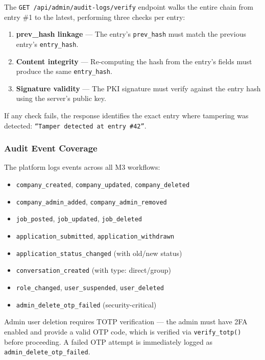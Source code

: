 The \texttt{GET /api/admin/audit-logs/verify} endpoint walks the entire chain from entry \#1 to the latest, performing three checks per entry:

\begin{enumerate}
    \item \textbf{prev\_hash linkage} — The entry's \texttt{prev\_hash} must match the previous entry's \texttt{entry\_hash}.
    \item \textbf{Content integrity} — Re-computing the hash from the entry's fields must produce the same \texttt{entry\_hash}.
    \item \textbf{Signature validity} — The PKI signature must verify against the entry hash using the server's public key.
\end{enumerate}

If any check fails, the response identifies the exact entry where tampering was detected: \texttt{``Tamper detected at entry \#42''}.

\subsubsection{Audit Event Coverage}

The platform logs events across all M3 workflows:
\begin{itemize}[noitemsep]
    \item \texttt{company\_created}, \texttt{company\_updated}, \texttt{company\_deleted}
    \item \texttt{company\_admin\_added}, \texttt{company\_admin\_removed}
    \item \texttt{job\_posted}, \texttt{job\_updated}, \texttt{job\_deleted}
    \item \texttt{application\_submitted}, \texttt{application\_withdrawn}
    \item \texttt{application\_status\_changed} (with old/new status)
    \item \texttt{conversation\_created} (with type: direct/group)
    \item \texttt{role\_changed}, \texttt{user\_suspended}, \texttt{user\_deleted}
    \item \texttt{admin\_delete\_otp\_failed} (security-critical)
\end{itemize}

Admin user deletion requires TOTP verification — the admin must have 2FA enabled and provide a valid OTP code, which is verified via \texttt{verify\_totp()} before proceeding. A failed OTP attempt is immediately logged as \texttt{admin\_delete\_otp\_failed}.

